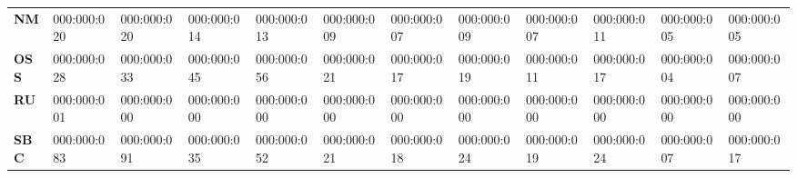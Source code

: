 {{\begin{tabular}{llllllllllll}
\textbf{NM}                   & 000:000:020                                                                            & 000:000:020                                                                          & 000:000:014                         & 000:000:013                           & 000:000:009                                                                                      & 000:000:007                           & 000:000:009                           & 000:000:007                           & 000:000:011                            & 000:000:005                         & 000:000:005                                                                          \\
\textbf{OSS}                  & 000:000:028                                                                            & 000:000:033                                                                          & 000:000:045                         & 000:000:056                           & 000:000:021                                                                                      & 000:000:017                           & 000:000:019                           & 000:000:011                           & 000:000:017                            & 000:000:004                         & 000:000:007                                                                          \\
\textbf{RU}                   & 000:000:001                                                                            & 000:000:000                                                                          & 000:000:000                         & 000:000:000                           & 000:000:000                                                                                      & 000:000:000                           & 000:000:000                           & 000:000:000                           & 000:000:000                            & 000:000:000                         & 000:000:000                                                                          \\
\textbf{SBC}                  & 000:000:083                                                                            & 000:000:091                                                                          & 000:000:035                         & 000:000:052                           & 000:000:021                                                                                      & 000:000:018                           & 000:000:024                           & 000:000:019                           & 000:000:024                            & 000:000:007                         & 000:000:017                                                                          \\

\end{tabular}}}

